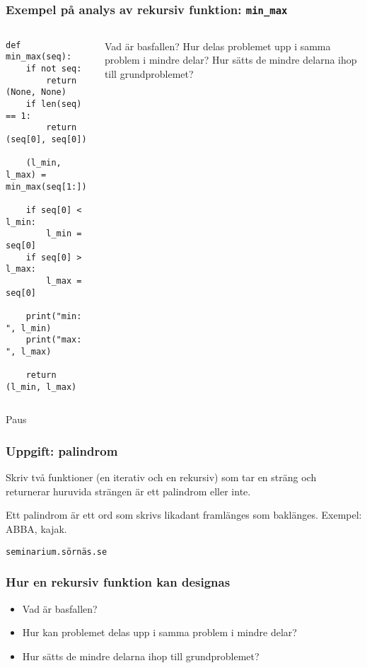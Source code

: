 \documentclass{beamer}
\begin{document}
  \begin{frame}[fragile]
    \frametitle{Exempel på analys av rekursiv funktion: \texttt{min\_max}}

    \begin{columns}
      \begin{column}{0.48\textwidth}
        \begin{verbatim}
def min_max(seq):
    if not seq:
        return (None, None)
    if len(seq) == 1:
        return (seq[0], seq[0])

    (l_min, l_max) = min_max(seq[1:])

    if seq[0] < l_min:
        l_min = seq[0]
    if seq[0] > l_max:
        l_max = seq[0]

    print("min: ", l_min)
    print("max: ", l_max)

    return (l_min, l_max)
        \end{verbatim}

      \end{column}%
      \begin{column}{0.48\textwidth}
         {Vad är basfallen?}%
         {Hur delas problemet upp i samma problem i mindre delar?}%
         {Hur sätts de mindre delarna ihop till grundproblemet?}%
      \end{column}
    \end{columns}

  \end{frame}

  \begin{frame}

    \begin{center}
      \Huge Paus
    \end{center}

  \end{frame}

  \begin{frame}[fragile]
    \frametitle{Uppgift: palindrom}

    Skriv två funktioner (en iterativ och en rekursiv) som tar en sträng och
    returnerar huruvida strängen är ett palindrom eller inte.

    Ett palindrom är ett ord som skrivs likadant framlänges som baklänges.
    Exempel: ABBA, kajak.

    \texttt{seminarium.sörnäs.se}

  \end{frame}

  \begin{frame}
    \frametitle{Hur en rekursiv funktion kan designas}

    \begin{itemize}
      \item Vad är basfallen?
      \item Hur kan problemet delas upp i samma problem i mindre delar?
      \item Hur sätts de mindre delarna ihop till grundproblemet?
    \end{itemize}
  \end{frame}
\end{document}

